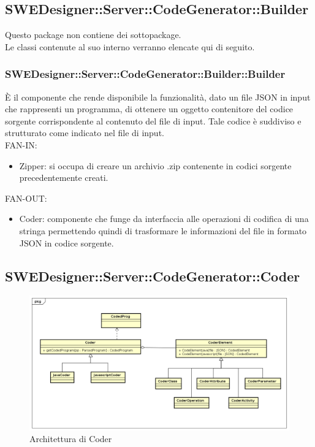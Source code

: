 \documentclass[../DefinizioneDiProdotto.tex]{subfiles}
\begin{document}
			\subsection{SWEDesigner::Server::CodeGenerator::Builder}
				Questo package non contiene dei sottopackage.\\
				Le classi contenute al suo interno verranno elencate qui di seguito.
				\subsubsection{SWEDesigner::Server::CodeGenerator::Builder::Builder}
				È il componente che rende disponibile la funzionalità, dato un file JSON in input che rappresenti un programma, di ottenere un oggetto contenitore del codice sorgente corrispondente al contenuto del file di input. Tale codice è suddiviso e strutturato come indicato nel file di input.\\
					FAN-IN:
					\begin{itemize}
						\item Zipper: si occupa di creare un archivio .zip contenente in codici sorgente precedentemente creati.
					\end{itemize}
					FAN-OUT:
					\begin{itemize}
						\item Coder: componente che funge da interfaccia alle operazioni di codifica di una stringa permettendo quindi di trasformare le informazioni del file in formato JSON in codice sorgente.
					\end{itemize}

			\subsection{SWEDesigner::Server::CodeGenerator::Coder}
				\begin{figure}[H]\label{fig:Coder}
					\centering
					\includegraphics[scale=0.46]{Immagini/DiagrammaArchitettura/Coder.png}
					\caption{Architettura di Coder}
				\end{figure}
\end{document}
